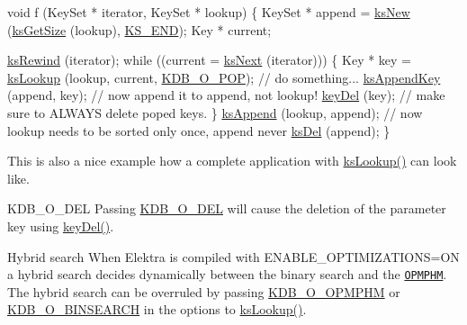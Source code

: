 \begin{DoxyCodeInclude}
\textcolor{keywordtype}{void} f (KeySet * iterator, KeySet * lookup)
\{
        KeySet * append = \hyperlink{group__keyset_ga671e1aaee3ae9dc13b4834a4ddbd2c3c}{ksNew} (\hyperlink{group__keyset_ga7474ad6b0a0fa969dbdf267ba5770eee}{ksGetSize} (lookup), \hyperlink{group__keyset_ga7a28fce3773b2c873c94ac80b8b4cd54}{KS\_END});
        Key * current;

        \hyperlink{group__keyset_gabe793ff51f1728e3429c84a8a9086b70}{ksRewind} (iterator);
        \textcolor{keywordflow}{while} ((current = \hyperlink{group__keyset_ga317321c9065b5a4b3e33fe1c399bcec9}{ksNext} (iterator)))
        \{
                Key * key = \hyperlink{group__keyset_ga60f1ddcf23272f2b29b90e92ebe9b56f}{ksLookup} (lookup, current, \hyperlink{group__keyset_ggada05f4bbf46fde81d0d57df86e73d914a52fb5f2cc86773d393da62bebebf7984}{KDB\_O\_POP});
                \textcolor{comment}{// do something...}
                \hyperlink{group__keyset_gaa5a1d467a4d71041edce68ea7748ce45}{ksAppendKey} (append, key); \textcolor{comment}{// now append it to append, not lookup!}
                \hyperlink{group__key_ga3df95bbc2494e3e6703ece5639be5bb1}{keyDel} (key);                \textcolor{comment}{// make sure to ALWAYS delete poped keys.}
        \}
        \hyperlink{group__keyset_ga21eb9c3a14a604ee3a8bdc779232e7b7}{ksAppend} (lookup, append);
        \textcolor{comment}{// now lookup needs to be sorted only once, append never}
        \hyperlink{group__keyset_ga27e5c16473b02a422238c8d970db7ac8}{ksDel} (append);
\}
\end{DoxyCodeInclude}
 This is also a nice example how a complete application with \hyperlink{group__keyset_ga60f1ddcf23272f2b29b90e92ebe9b56f}{ks\+Lookup()} can look like.

\begin{DoxyParagraph}{K\+D\+B\+\_\+\+O\+\_\+\+D\+EL}
Passing \hyperlink{group__keyset_ggada05f4bbf46fde81d0d57df86e73d914a66a5380c120f25f28f49848c4a863ead}{K\+D\+B\+\_\+\+O\+\_\+\+D\+EL} will cause the deletion of the parameter {\ttfamily key} using \hyperlink{group__key_ga3df95bbc2494e3e6703ece5639be5bb1}{key\+Del()}.
\end{DoxyParagraph}
\begin{DoxyParagraph}{Hybrid search}
When Elektra is compiled with {\ttfamily E\+N\+A\+B\+L\+E\+\_\+\+O\+P\+T\+I\+M\+I\+Z\+A\+T\+I\+O\+NS=ON} a hybrid search decides dynamically between the binary search and the \href{https://master.libelektra.org/doc/dev/data-structures.md#order-preserving-minimal-perfect-hash-map-aka-opmphm}{\tt O\+P\+M\+P\+HM}. The hybrid search can be overruled by passing \hyperlink{kdbhelper_8h_a93673533c4c8eb1fdfca76b98c5f49b0afe9f6ff6e374540baf600a918b07ee6e}{K\+D\+B\+\_\+\+O\+\_\+\+O\+P\+M\+P\+HM} or \hyperlink{kdbhelper_8h_a93673533c4c8eb1fdfca76b98c5f49b0ac67a43bd273203575090d26010f6c995}{K\+D\+B\+\_\+\+O\+\_\+\+B\+I\+N\+S\+E\+A\+R\+CH} in the options to \hyperlink{group__keyset_ga60f1ddcf23272f2b29b90e92ebe9b56f}{ks\+Lookup()}.
\end{DoxyParagraph}


